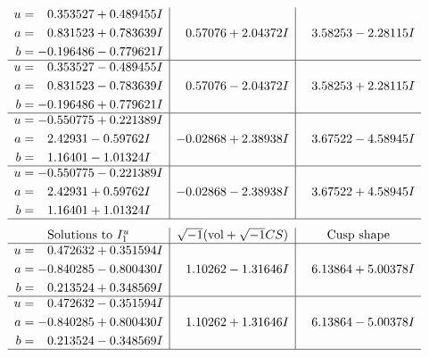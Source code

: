 \documentclass[1p]{elsarticle_modified}
\theoremstyle{definition}
\newcommand{\I}{\sqrt{-1}}
\begin{document}
$$\begin{array}{c|c|c}
\begin{aligned}
u &= \phantom{-}0.353527 + 0.489455 I \\
a &= \phantom{-}0.831523 + 0.783639 I \\
b &= -0.196486 - 0.779621 I\end{aligned}
 & \phantom{-}0.57076 + 2.04372 I & \phantom{-}3.58253 - 2.28115 I \\ \hline\begin{aligned}
u &= \phantom{-}0.353527 - 0.489455 I \\
a &= \phantom{-}0.831523 - 0.783639 I \\
b &= -0.196486 + 0.779621 I\end{aligned}
 & \phantom{-}0.57076 - 2.04372 I & \phantom{-}3.58253 + 2.28115 I \\ \hline\begin{aligned}
u &= -0.550775 + 0.221389 I \\
a &= \phantom{-}2.42931 - 0.59762 I \\
b &= \phantom{-}1.16401 - 1.01324 I\end{aligned}
 & -0.02868 + 2.38938 I & \phantom{-}3.67522 - 4.58945 I \\ \hline\begin{aligned}
u &= -0.550775 - 0.221389 I \\
a &= \phantom{-}2.42931 + 0.59762 I \\
b &= \phantom{-}1.16401 + 1.01324 I\end{aligned}
 & -0.02868 - 2.38938 I & \phantom{-}3.67522 + 4.58945 I\\
 \hline 
 \end{array}$$\newpage$$\begin{array}{c|c|c}  
\text{Solutions to }I^u_{1}& \I (\text{vol} + \sqrt{-1}CS) & \text{Cusp shape}\\
 \hline 
\begin{aligned}
u &= \phantom{-}0.472632 + 0.351594 I \\
a &= -0.840285 - 0.800430 I \\
b &= \phantom{-}0.213524 + 0.348569 I\end{aligned}
 & \phantom{-}1.10262 - 1.31646 I & \phantom{-}6.13864 + 5.00378 I \\ \hline\begin{aligned}
u &= \phantom{-}0.472632 - 0.351594 I \\
a &= -0.840285 + 0.800430 I \\
b &= \phantom{-}0.213524 - 0.348569 I\end{aligned}
 & \phantom{-}1.10262 + 1.31646 I & \phantom{-}6.13864 - 5.00378 I\\
 \hline 
 \end{array}$$\newpage\newpage\renewcommand{\arraystretch}{1}
\end{document}
